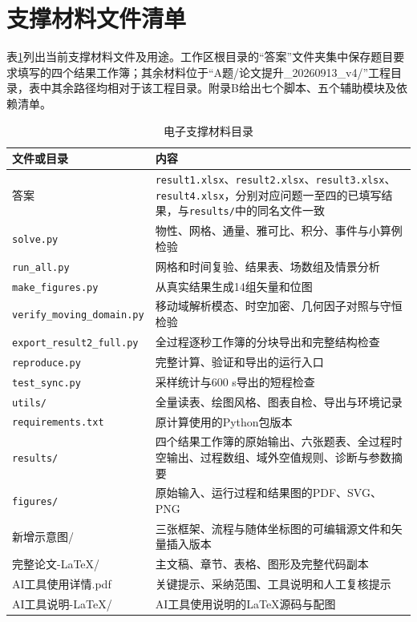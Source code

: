 \section{支撑材料文件清单}\label{app:materials}
表\ref{tab:catalog}列出当前支撑材料文件及用途。工作区根目录的“答案”文件夹集中保存题目要求填写的四个结果工作簿；其余材料位于“A题/论文提升\_20260913\_v4/”工程目录，表中其余路径均相对于该工程目录。附录B给出七个脚本、五个辅助模块及依赖清单。

\begin{table}[htbp]\centering\small
\caption{电子支撑材料目录}\label{tab:catalog}
\begin{tabularx}{\linewidth}{lX}
\toprule
文件或目录 & 内容\\
\midrule
答案 & \texttt{result1.xlsx}、\texttt{result2.xlsx}、\texttt{result3.xlsx}、\texttt{result4.xlsx}，分别对应问题一至四的已填写结果，与\texttt{results/}中的同名文件一致\\
\texttt{solve.py} & 物性、网格、通量、雅可比、积分、事件与小算例检验\\
\texttt{run\_all.py} & 网格和时间复验、结果表、场数组及情景分析\\
\texttt{make\_figures.py} & 从真实结果生成14组矢量和位图\\
\texttt{verify\_moving\_domain.py} & 移动域解析模态、时空加密、几何因子对照与守恒检验\\
\texttt{export\_result2\_full.py} & 全过程逐秒工作簿的分块导出和完整结构检查\\
\texttt{reproduce.py} & 完整计算、验证和导出的运行入口\\
\texttt{test\_sync.py} & 采样统计与600 s导出的短程检查\\
\texttt{utils/} & 全量读表、绘图风格、图表自检、导出与环境记录\\
\texttt{requirements.txt} & 原计算使用的Python包版本\\
\texttt{results/} & 四个结果工作簿的原始输出、六张题表、全过程时空输出、过程数组、域外空值规则、诊断与参数摘要\\
\texttt{figures/} & 原始输入、运行过程和结果图的PDF、SVG、PNG\\
新增示意图/ & 三张框架、流程与随体坐标图的可编辑源文件和矢量插入版本\\
完整论文-LaTeX/ & 主文稿、章节、表格、图形及完整代码副本\\
AI工具使用详情.pdf & 关键提示、采纳范围、工具说明和人工复核提示\\
AI工具说明-LaTeX/ & AI工具使用说明的LaTeX源码与配图\\
\bottomrule
\end{tabularx}
\end{table}

